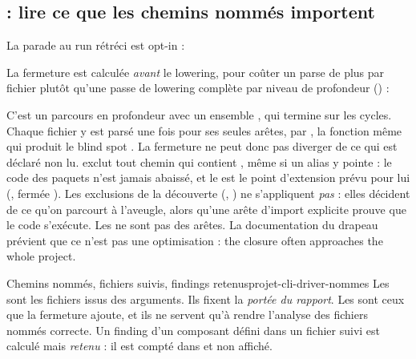 \subsection{ : lire ce que les chemins nommés importent}
\label{sec:projet-cli-driver-follow}

La parade au run rétréci est opt-in :


La fermeture est calculée \emph{avant} le lowering, pour coûter un parse de plus par fichier plutôt qu'une passe de lowering complète par niveau de profondeur () :


C'est un parcours en profondeur avec un ensemble , qui termine sur les cycles. Chaque fichier y est parsé une fois pour ses seules arêtes, par , la fonction même qui produit le blind spot . La fermeture ne peut donc pas diverger de ce qui est déclaré non lu.  exclut tout chemin qui contient , même si un alias  y pointe : le code des paquets n'est jamais abaissé, et le  est le point d'extension prévu pour lui (, fermée ). Les exclusions de la découverte (, ) ne s'appliquent \emph{pas} : elles décident de ce qu'on parcourt à l'aveugle, alors qu'une arête d'import explicite prouve que le code s'exécute. Les  ne sont pas des arêtes. La documentation du drapeau prévient que ce n'est pas une optimisation : \og the closure often approaches the whole project\fg{}.

\begin{definition}{Chemins nommés, fichiers suivis, findings retenus}{projet-cli-driver-nommes}
Les  sont les fichiers issus des arguments. Ils fixent la \emph{portée du rapport}. Les  sont ceux que la fermeture ajoute, et ils ne servent qu'à rendre l'analyse des fichiers nommés correcte. Un finding d'un composant défini dans un fichier suivi est calculé mais \emph{retenu} : il est compté dans  et non affiché.
\end{definition}

